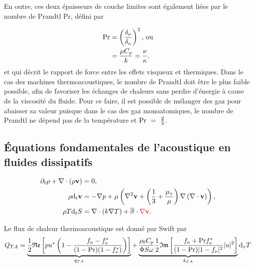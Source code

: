 En outre, ces deux épaisseurs de couche limites sont également liées par le nombre de Prandtl $\mathrm{Pr}$, défini par

\begin{subequations}
	\begin{align}
		\mathrm{Pr} &= \left(\frac{\delta_{\nu}}{\delta_{\kappa}}\right)^2 \text{, ou} \label{eq:Prandtl_delta}\\
				&= \frac{\mu C_{p}}{k} = \frac{\nu}{\kappa}, \label{eq:Prandtl_MuK_NuKappa}
	\end{align}
	\label{eq:Prandtl}%
\end{subequations}
et qui décrit le rapport de force entre les effets visqueux et thermiques. Dans le cas des machines thermoacoustiques, le nombre de Prandtl doit être le plus faible possible, afin de favoriser les échanges de chaleurs sans perdre d'énergie à cause de la viscosité du fluide. Pour ce faire, il est possible de mélanger des gaz pour abaisser sa valeur \cite{belcher_working_1999} puisque dans le cas des gaz monoatomiques, le nombre de Prandtl ne dépend pas de la température et $\mathrm{Pr}~=~\frac{2}{3}$.

\subsection{\'Equations fondamentales de l'acoustique en fluides dissipatifs}

\begin{subequations}
	\begin{align}
		\partial_t \rho + \nabla \cdot (\rho \mathbf v) &= 0, \label{eq:ConservMass}\\
		\rho \mathrm{d}_t \mathbf v &= -\nabla p + \mu\left( \nabla^2 \mathbf v +\left(\frac13+\frac{\mu_v}{\mu} \right)\nabla\left(\nabla \cdot \mathbf v\right)\right), \label{eq:NavierStokes_QteMvt_base}\\
		\rho T\mathrm{d}_t S &= \nabla\cdot (k \nabla T) + \overline{\overline{\sigma}}\cdot \textcolor{red}{\nabla \mathbf v}. \label{eq:ConservEnergie}
	\end{align}
\end{subequations}

Le flux de chaleur thermoacoustique est donné par Swift \cite{swift_thermoacoustics_2017} par
\begin{equation}
	Q_{TA} = \underbrace{\frac{1}{2} \mathfrak{Re}\left[pu^* \left( 1 - \frac{f_\kappa - f_\nu^*}{(1 - \mathrm{Pr})(1 - f_\nu^*)} \right) \right]}_{q_{TA}} + \underbrace{\frac{\rho_0 C_p }{\Phi S \omega } \frac{1}{2} \mathfrak{Im} \left[ \frac{f_\kappa + \mathrm{Pr} f_\nu^*}{(1-\mathrm{Pr})|1-f_\nu|^2} |u|^2\right]}_{k_{TA}} \mathrm{d}_x T
	\label{eq:FluxTA_swift}
\end{equation}


